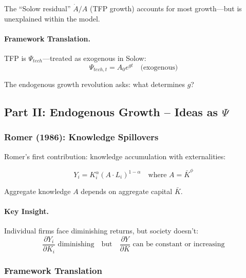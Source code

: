 The ``Solow residual'' $\dot{A}/A$ (TFP growth) accounts for most growth---but 
is unexplained within the model.

\paragraph{Framework Translation.}
TFP is $\Psi_{tech}$---treated as exogenous in Solow:
\begin{equation}
\Psi_{tech,t} = A_0 e^{gt} \quad \text{(exogenous)}
\end{equation}

The endogenous growth revolution asks: what determines $g$?

\subsection{Part II: Endogenous Growth – Ideas as $\Psi$}

\subsubsection{Romer (1986): Knowledge Spillovers}

Romer's first contribution: knowledge accumulation with externalities:

\begin{equation}
\boxed{
Y_i = K_i^\alpha (A \cdot L_i)^{1-\alpha} \quad \text{where } A = \bar{K}^\phi
}
\label{eq:romer86}
\end{equation}

Aggregate knowledge $A$ depends on aggregate capital $\bar{K}$.

\paragraph{Key Insight.}
Individual firms face diminishing returns, but society doesn't:
\begin{equation}
\frac{\partial Y_i}{\partial K_i} \text{ diminishing} \quad \text{but} \quad 
\frac{\partial Y}{\partial K} \text{ can be constant or increasing}
\end{equation}

\subsubsection{Framework Translation}


